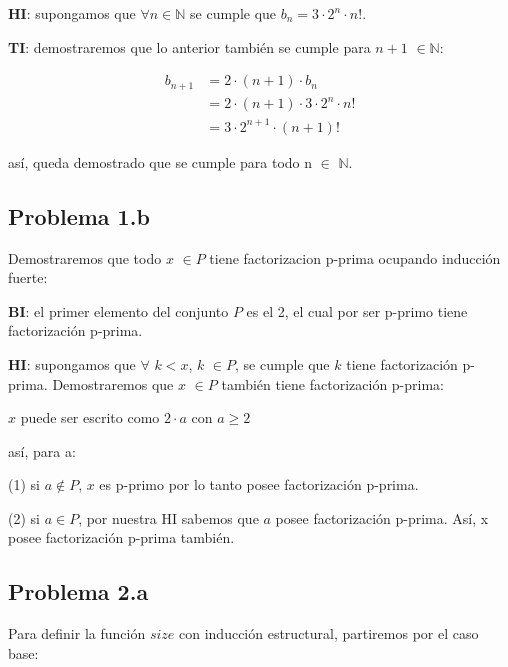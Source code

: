 \documentclass[12pt]{article}
\newcommand{\N}{\mathbb{N}}
\begin{document}
\textbf{HI}: supongamos que $\forall n \in \N$ se cumple que $b_n = 3 \cdot 2^n \cdot n!$.

\textbf{TI}: demostraremos que lo anterior también se cumple para $n + 1$ $\in \N$:

\begin{equation*}
    \begin{aligned}
        b_{n+1} &= 2 \cdot (n + 1) \cdot b_n \\
                &= 2 \cdot (n + 1) \cdot 3 \cdot 2^n \cdot n! \\
                &= 3 \cdot 2^{n+1} \cdot (n + 1)!
    \end{aligned}
\end{equation*}

así, queda demostrado que se cumple para todo n $\in$ $\N$.


\newpage

\subsection*{Problema 1.b}

Demostraremos que todo $x$ $\in P$ tiene factorizacion p-prima ocupando inducción fuerte:

\textbf{BI}: el primer elemento del conjunto $P$ es el 2, el cual por ser p-primo tiene factorización p-prima.

\textbf{HI}: supongamos que $\forall$ $k < x$, $k$ $\in P$, se cumple que $k$ tiene factorización p-prima. Demostraremos que $x$ $\in P$ también tiene factorización p-prima: 

$x$ puede ser escrito como $2 \cdot a$ con $a \geq 2$

así, para a: 

(1) si  $a \notin P$, $x$ es p-primo por lo tanto posee factorización p-prima. 

(2) si $a \in P$, por nuestra HI sabemos que $a$ posee factorización p-prima. Así, x posee factorización p-prima también.

\newpage

\subsection*{Problema 2.a}

Para definir la función $size$ con inducción estructural, partiremos por el caso base:
\end{document}
